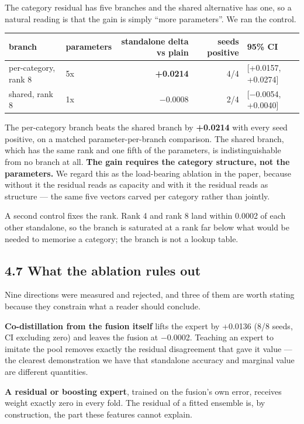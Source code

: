 The category residual has five branches and the shared alternative has one, so a natural reading is that
the gain is simply ``more parameters''. We ran the control.

\begin{longtable}[]{@{}llrrl@{}}
\toprule
branch & parameters & standalone delta vs plain & seeds positive & 95\% CI \\
\midrule
\endhead
per-category, rank 8 & 5x & \textbf{+0.0214} & 4/4 & {[}+0.0157, +0.0274{]} \\
shared, rank 8 & 1x & −0.0008 & 2/4 & {[}−0.0054, +0.0040{]} \\
\bottomrule
\end{longtable}

The per-category branch beats the shared branch by \textbf{+0.0214} with every seed positive, on a matched
parameter-per-branch comparison. The shared branch, which has the same rank and one fifth of the
parameters, is indistinguishable from no branch at all. \textbf{The gain requires the category structure, not
the parameters.} We regard this as the load-bearing ablation in the paper, because without it the
residual reads as capacity and with it the residual reads as structure --- the same five vectors carved
per category rather than jointly.

A second control fixes the rank. Rank 4 and rank 8 land within 0.0002 of each other standalone, so the
branch is saturated at a rank far below what would be needed to memorise a category; the branch is not
a lookup table.

\hypertarget{what-the-ablation-rules-out}{%
\subsection{4.7 What the ablation rules out}\label{what-the-ablation-rules-out}}

Nine directions were measured and rejected, and three of them are worth stating because they constrain
what a reader should conclude.

\textbf{Co-distillation from the fusion itself} lifts the expert by +0.0136 (8/8 seeds, CI excluding zero)
and leaves the fusion at −0.0002. Teaching an expert to imitate the pool removes exactly the residual
disagreement that gave it value --- the clearest demonstration we have that standalone accuracy and
marginal value are different quantities.

\textbf{A residual or boosting expert}, trained on the fusion's own error, receives weight exactly zero in
every fold. The residual of a fitted ensemble is, by construction, the part these features cannot
explain.

